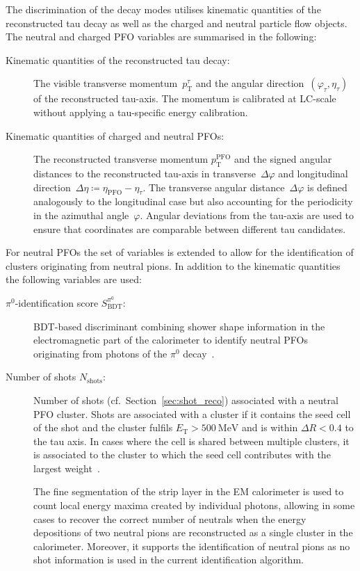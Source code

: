 The discrimination of the decay modes utilises kinematic quantities of the
reconstructed tau decay as well as the charged and neutral particle flow
objects. The neutral and charged PFO variables are summarised in the following:
\begin{description}
\item[Kinematic quantities of the reconstructed tau decay:] The visible
  transverse momentum~$p_\text{T}^\tau$ and the angular
  direction~$(\varphi_\tau, \eta_\tau)$ of the reconstructed tau-axis. The
  momentum is calibrated at LC-scale without applying a tau-specific energy
  calibration.

\item[Kinematic quantities of charged and neutral PFOs:] The reconstructed
  transverse momentum $p_\text{T}^\text{PFO}$ and the signed angular distances
  to the reconstructed tau-axis in transverse~$\Delta\varphi$ and longitudinal
  direction~$\Delta\eta \coloneqq \eta_\text{PFO} - \eta_\tau$. The transverse
  angular distance~$\Delta\varphi$ is defined analogously to the longitudinal
  case but also accounting for the periodicity in the azimuthal angle~$\varphi$.
  Angular deviations from the tau-axis are used to ensure that coordinates are
  comparable between different tau candidates.
\end{description}
For neutral PFOs the set of variables is extended to allow for the
identification of clusters originating from neutral pions. In addition to the
kinematic quantities the following variables are used:
\begin{description}
\item[$\pi^0$-identification score $S_\text{BDT}^{\pi^0}$:] BDT-based
  discriminant combining shower shape information in the electromagnetic part of
  the calorimeter to identify neutral PFOs originating from photons of the
  $\pi^0$ decay~\cite{atlas:taurec:decaymodes}.

\item[Number of shots $N_\text{shots}$:] Number of shots (cf.\
  Section~\ref{sec:shot_reco}) associated with a neutral PFO cluster. Shots are
  associated with a cluster if it contains the seed cell of the shot and the
  cluster fulfils $E_\text{T} > \SI{500}{\mega\electronvolt}$ and is within
  $\Delta R < 0.4$ to the tau axis. In cases where the cell is shared between
  multiple clusters, it is associated to the cluster to which the seed cell
  contributes with the largest weight~\cite{athena}.

  The fine segmentation of the strip layer in the EM calorimeter is used to
  count local energy maxima created by individual photons, allowing in some
  cases to recover the correct number of neutrals when the energy depositions of
  two neutral pions are reconstructed as a single cluster in the calorimeter.
  Moreover, it supports the identification of neutral pions as no shot
  information is used in the current identification algorithm.
\end{description}

